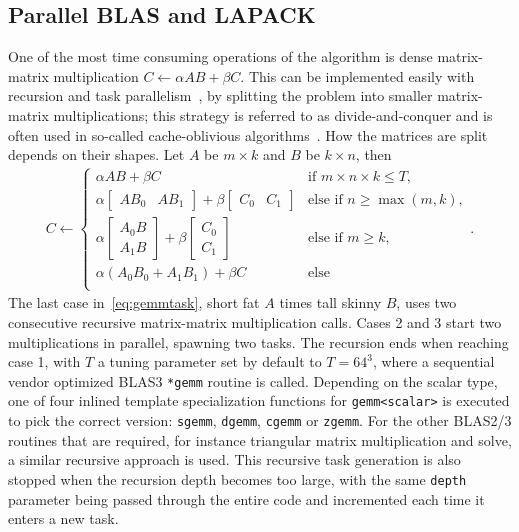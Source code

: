 \documentclass{article}
\begin{document}
\subsection{Parallel BLAS and LAPACK}
One of the most time consuming operations of the algorithm is dense
matrix-matrix multiplication $C \gets \alpha AB+\beta C$. This can be
implemented easily with recursion and task
parallelism~\cite{mccool2012structured}, by splitting the problem into
smaller matrix-matrix multiplications; this strategy is referred to as
divide-and-conquer and is often used in so-called cache-oblivious
algorithms~\cite{frigo1999cache}. How the matrices are split depends
on their shapes. Let $A$ be $m \times k$ and $B$ be $k \times n$, then
\begin{align}\label{eq:gemmtask}
  C \gets \begin{cases}
    \alpha A B + \beta C & \textrm{if } m \times n \times k \leq T , \\
    \alpha \begin{bmatrix} A B_0 &  A B_1 \end{bmatrix} + \beta\begin{bmatrix} C_0 & C_1\end{bmatrix} & \textrm{else if } n \geq \max(m,k), \\
    \alpha \begin{bmatrix} A_0 B \\  A_1 B \end{bmatrix} + \beta\begin{bmatrix} C_0 \\ C_1\end{bmatrix} & \textrm{else if } m \geq k, \\
    \alpha \left( A_0 B_0 + A_1 B_1 \right) + \beta C & \textrm{else} \\
  \end{cases} .
\end{align}
The last case in~\eqref{eq:gemmtask}, short fat $A$ times tall skinny
$B$, uses two consecutive recursive matrix-matrix multiplication
calls. Cases 2 and 3 start two multiplications in parallel, spawning
two tasks. The recursion ends when reaching case 1, with $T$ a tuning
parameter set by default to $T=64^3$, where a sequential vendor
optimized BLAS3 \verb+*gemm+ routine is called. Depending on the
scalar type, one of four inlined template specialization functions for
\verb+gemm<scalar>+ is executed to pick the correct version:
\verb+sgemm+, \verb+dgemm+, \verb+cgemm+ or \verb+zgemm+. For the
other BLAS2/3 routines that are required, for instance triangular
matrix multiplication and solve, a similar recursive approach is
used. This recursive task generation is also stopped when the
recursion depth becomes too large, with the same \verb+depth+
parameter being passed through the entire code and incremented each
time it enters a new task.
\end{document}
